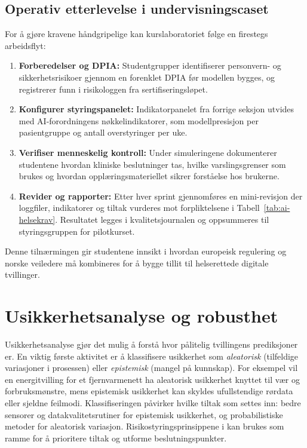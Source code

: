 \subsection{Operativ etterlevelse i undervisningscaset}
For å gjøre kravene håndgripelige kan kurslaboratoriet følge en firestegs arbeidsflyt:
\begin{enumerate}
    \item \textbf{Forberedelser og DPIA:} Studentgrupper identifiserer personvern- og sikkerhetsrisikoer gjennom en forenklet DPIA før modellen bygges, og registrerer funn i risikologgen fra sertifiseringsløpet.\citep{datatilsynet2023dpia}
    \item \textbf{Konfigurer styringspanelet:} Indikatorpanelet fra forrige seksjon utvides med AI-forordningens nøkkelindikatorer, som modellpresisjon per pasientgruppe og antall overstyringer per uke.
    \item \textbf{Verifiser menneskelig kontroll:} Under simuleringene dokumenterer studentene hvordan kliniske beslutninger tas, hvilke varslingsgrenser som brukes og hvordan opplæringsmateriellet sikrer forståelse hos brukerne.
    \item \textbf{Revider og rapporter:} Etter hver sprint gjennomføres en mini-revisjon der loggfiler, indikatorer og tiltak vurderes mot forpliktelsene i Tabell~\ref{tab:ai-helsekrav}. Resultatet legges i kvalitetsjournalen og oppsummeres til styringsgruppen for pilotkurset.
\end{enumerate}

Denne tilnærmingen gir studentene innsikt i hvordan europeisk regulering og norske veiledere må kombineres for å bygge tillit til helserettede digitale tvillinger.

\section{Usikkerhetsanalyse og robusthet}
Usikkerhetsanalyse gjør det mulig å forstå hvor pålitelig tvillingens prediksjoner er. En viktig første aktivitet er å klassifisere usikkerhet som \textit{aleatorisk} (tilfeldige variasjoner i prosessen) eller \textit{epistemisk} (mangel på kunnskap). For eksempel vil en energitvilling for et fjernvarmenett ha aleatorisk usikkerhet knyttet til vær og forbruksmønstre, mens epistemisk usikkerhet kan skyldes ufullstendige rørdata eller sjeldne feilmodi. Klassifiseringen påvirker hvilke tiltak som settes inn: bedre sensorer og datakvalitetsrutiner for epistemisk usikkerhet, og probabilistiske metoder for aleatorisk variasjon. Risikostyringsprinsippene i \citet{iso31000-2018} kan brukes som ramme for å prioritere tiltak og utforme beslutningspunkter.

